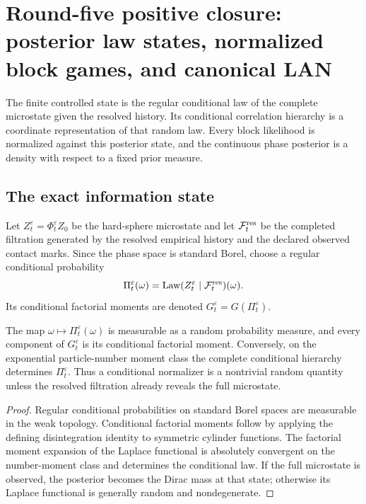 \section{Round-five positive closure: posterior law states, normalized block games, and canonical LAN}
\label{sec:r5-c1}

The finite controlled state is the regular conditional law of the complete
microstate given the resolved history.  Its conditional correlation hierarchy
is a coordinate representation of that random law.  Every block likelihood is
normalized against this posterior state, and the continuous phase posterior is
a density with respect to a fixed prior measure.

\subsection{The exact information state}

Let \(Z_t^\varepsilon=\Phi_t^\varepsilon Z_0\) be the hard-sphere microstate and
let \(\mathcal F_t^{\rm res}\) be the completed filtration generated by the
resolved empirical history and the declared observed contact marks.  Since the
phase space is standard Borel, choose a regular conditional probability
\[
 \Pi_t^\varepsilon(\omega)=
 \operatorname{Law}(Z_t^\varepsilon\mid\mathcal F_t^{\rm res})(\omega).
\]
Its conditional factorial moments are denoted
\(G_t^\varepsilon=G(\Pi_t^\varepsilon)\).

\begin{lemma}
\label{lem:r5-c1-posterior}
The map \(\omega\mapsto\Pi_t^\varepsilon(\omega)\) is measurable as a random
probability measure, and every component of \(G_t^\varepsilon\) is its
conditional factorial moment.  Conversely, on the exponential
particle-number moment class the complete conditional hierarchy determines
\(\Pi_t^\varepsilon\).  Thus a conditional normalizer is a nontrivial random
quantity unless the resolved filtration already reveals the full microstate.
\end{lemma}

\begin{proof}
Regular conditional probabilities on standard Borel spaces are measurable in
the weak topology.  Conditional factorial moments follow by applying the
defining disintegration identity to symmetric cylinder functions.  The
factorial moment expansion of the Laplace functional is absolutely convergent
on the number-moment class and determines the conditional law.  If the full
microstate is observed, the posterior becomes the Dirac mass at that state;
otherwise its Laplace functional is generally random and nondegenerate.
\end{proof}


